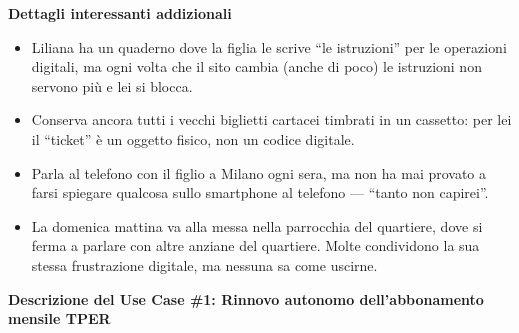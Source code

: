 \documentclass[11pt,a4paper]{article}
\begin{document}
\vspace{0.3cm}


\begin{tcolorbox}[colback=backgroundColor!50,colframe=borderColor,arc=2mm]
    \textbf{Dettagli interessanti addizionali} \\[4pt]
    {\small
    \begin{itemize}[leftmargin=*]
        \item Liliana ha un quaderno dove la figlia le scrive ``le istruzioni'' per le operazioni digitali, ma ogni volta che il sito cambia (anche di poco) le istruzioni non servono più e lei si blocca.
        \item Conserva ancora tutti i vecchi biglietti cartacei timbrati in un cassetto: per lei il ``ticket'' è un oggetto fisico, non un codice digitale.
        \item Parla al telefono con il figlio a Milano ogni sera, ma non ha mai provato a farsi spiegare qualcosa sullo smartphone al telefono --- ``tanto non capirei''.
        \item La domenica mattina va alla messa nella parrocchia del quartiere, dove si ferma a parlare con altre anziane del quartiere. Molte condividono la sua stessa frustrazione digitale, ma nessuna sa come uscirne.
    \end{itemize}
    }
\end{tcolorbox}

\newpage


\begin{tcolorbox}[colback=primaryColor!10,colframe=primaryColor,arc=2mm]
    \textbf{Descrizione del Use Case \#1: Rinnovo autonomo dell'abbonamento mensile TPER}
\end{tcolorbox}

\vspace{0.3cm}
\end{document}
